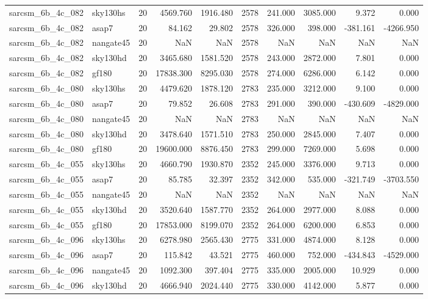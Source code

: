 \begin{tabular}{llrrrrrrrr}
sarcsm\_6b\_4c\_082 & sky130hs & 20 & 4569.760 & 1916.480 & 2578 & 241.000 & 3085.000 & 9.372 & 0.000 \\
sarcsm\_6b\_4c\_082 & asap7 & 20 & 84.162 & 29.802 & 2578 & 326.000 & 398.000 & -381.161 & -4266.950 \\
sarcsm\_6b\_4c\_082 & nangate45 & 20 & NaN & NaN & 2578 & NaN & NaN & NaN & NaN \\
sarcsm\_6b\_4c\_082 & sky130hd & 20 & 3465.680 & 1581.520 & 2578 & 243.000 & 2872.000 & 7.801 & 0.000 \\
sarcsm\_6b\_4c\_082 & gf180 & 20 & 17838.300 & 8295.030 & 2578 & 274.000 & 6286.000 & 6.142 & 0.000 \\
sarcsm\_6b\_4c\_080 & sky130hs & 20 & 4479.620 & 1878.120 & 2783 & 235.000 & 3212.000 & 9.100 & 0.000 \\
sarcsm\_6b\_4c\_080 & asap7 & 20 & 79.852 & 26.608 & 2783 & 291.000 & 390.000 & -430.609 & -4829.000 \\
sarcsm\_6b\_4c\_080 & nangate45 & 20 & NaN & NaN & 2783 & NaN & NaN & NaN & NaN \\
sarcsm\_6b\_4c\_080 & sky130hd & 20 & 3478.640 & 1571.510 & 2783 & 250.000 & 2845.000 & 7.407 & 0.000 \\
sarcsm\_6b\_4c\_080 & gf180 & 20 & 19600.000 & 8876.450 & 2783 & 299.000 & 7269.000 & 5.698 & 0.000 \\
sarcsm\_6b\_4c\_055 & sky130hs & 20 & 4660.790 & 1930.870 & 2352 & 245.000 & 3376.000 & 9.713 & 0.000 \\
sarcsm\_6b\_4c\_055 & asap7 & 20 & 85.785 & 32.397 & 2352 & 342.000 & 535.000 & -321.749 & -3703.550 \\
sarcsm\_6b\_4c\_055 & nangate45 & 20 & NaN & NaN & 2352 & NaN & NaN & NaN & NaN \\
sarcsm\_6b\_4c\_055 & sky130hd & 20 & 3520.640 & 1587.770 & 2352 & 264.000 & 2977.000 & 8.088 & 0.000 \\
sarcsm\_6b\_4c\_055 & gf180 & 20 & 17853.000 & 8199.070 & 2352 & 264.000 & 6200.000 & 6.853 & 0.000 \\
sarcsm\_6b\_4c\_096 & sky130hs & 20 & 6278.980 & 2565.430 & 2775 & 331.000 & 4874.000 & 8.128 & 0.000 \\
sarcsm\_6b\_4c\_096 & asap7 & 20 & 115.842 & 43.521 & 2775 & 460.000 & 752.000 & -434.843 & -4529.000 \\
sarcsm\_6b\_4c\_096 & nangate45 & 20 & 1092.300 & 397.404 & 2775 & 335.000 & 2005.000 & 10.929 & 0.000 \\
sarcsm\_6b\_4c\_096 & sky130hd & 20 & 4666.940 & 2024.440 & 2775 & 330.000 & 4142.000 & 5.877 & 0.000 \\

\end{tabular}
